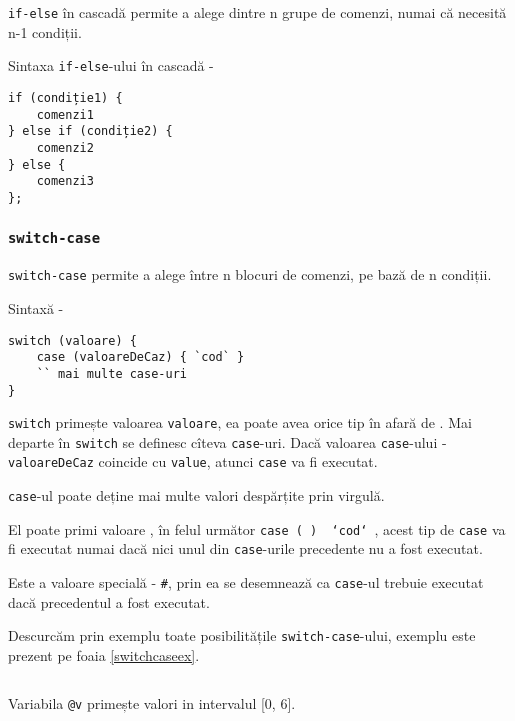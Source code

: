 \texttt{if-else} în cascadă permite a alege dintre n grupe de comenzi, numai că necesită n-1 condiții.

Sintaxa \texttt{if-else}-ului în cascadă -
\begin{verbatim}
if (condiție1) {
	comenzi1
} else if (condiție2) {
	comenzi2
} else {
	comenzi3
};
\end{verbatim}

\subsubsection{\texttt{switch-case}}

\texttt{switch-case} permite a alege între n blocuri de comenzi, pe bază de n condiții.

Sintaxă -
\begin{verbatim}
switch (valoare) {
	case (valoareDeCaz) { `cod` }
	`` mai multe case-uri
}
\end{verbatim}

\texttt{switch} primește valoarea \texttt{valoare}, ea poate avea orice tip în afară de \bool. Mai departe în \texttt{switch} se definesc cîteva \texttt{case}-uri. Dacă valoarea \texttt{case}-ului - \texttt{valoareDeCaz} coincide cu \texttt{value}, atunci \texttt{case} va fi executat.

\texttt{case}-ul poate deține mai multe valori despărțite prin virgulă.

El poate primi valoare \void, în felul următor \texttt{case (~) { `cod` }}, acest tip de \texttt{case} va fi executat numai dacă nici unul din \texttt{case}-urile precedente nu a fost executat.

Este a valoare specială - \texttt{#}, prin ea se desemnează ca \texttt{case}-ul trebuie executat dacă precedentul a fost executat.

Descurcăm prin exemplu toate posibilitățile \texttt{switch-case}-ului, exemplu este prezent pe foaia \ref{switchcaseex}.

\begin{sourcecode}
    \label{switchcaseex}
    \inputminted[linenos]{icl}{../sources/switchcaseex.icL}
\end{sourcecode}

Variabila \texttt{@v} primește valori in intervalul [0, 6].

